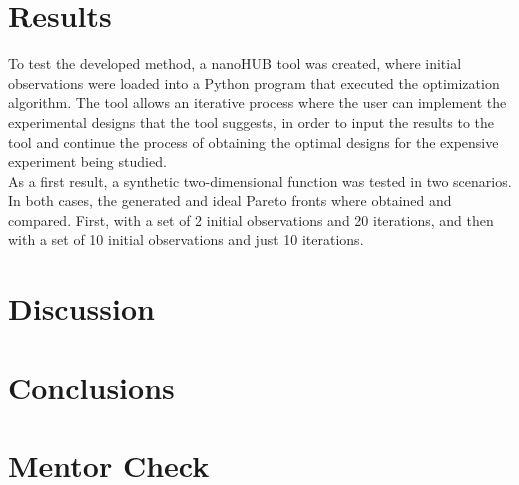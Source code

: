 \documentclass{article}
\begin{document}
\section{Results}

To test the developed method, a nanoHUB tool was created, where initial observations were loaded into a Python program that executed the optimization algorithm. The tool allows an iterative process where the user can implement the experimental designs that the tool suggests, in order to input the results to the tool and continue the process of obtaining the optimal designs for the expensive experiment being studied.\\

As a first result, a synthetic two-dimensional function was tested in two scenarios. In both cases, the generated and ideal Pareto fronts where obtained and compared. First, with a set of 2 initial observations and 20 iterations, and then with a set of 10 initial observations and just 10 iterations.

\section{Discussion}

\section{Conclusions}




\section{Mentor Check}
\end{document}
